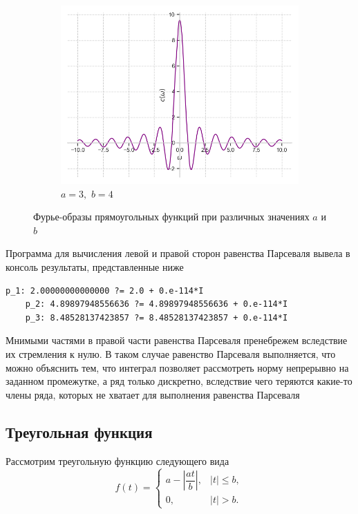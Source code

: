 \documentclass[a4paper, 16pt]{article}
\begin{document}
\begin{figure}[htbp]
\begin{subfigure}{0.3\textwidth}
        \end{subfigure}
        \hfill
        \begin{subfigure}{0.3\textwidth}
            \centering
            \includegraphics[width=\linewidth]{rectfimg_a=3_b=4.png}
            \caption{$a=3,\,\,b=4$}
            \label{fig:rectfimg_3}
        \end{subfigure}
        \caption{Фурье-образы прямоугольных функций при различных значениях $a$ и $b$}
        \label{fig:rectfimgs}
    \end{figure}


    \noindent Программа для вычисления левой и правой сторон равенства Парсеваля вывела в консоль результаты, представленные ниже
    \begin{lstlisting}[label=pres_rectf, caption=Результат выполнения программы для вычисления равенства Парсеваля]
    p_1: 2.00000000000000 ?= 2.0 + 0.e-114*I  
    p_2: 4.89897948556636 ?= 4.89897948556636 + 0.e-114*I 
    p_3: 8.48528137423857 ?= 8.48528137423857 + 0.e-114*I
    \end{lstlisting}


    \noindent Мнимыми частями в правой части равенства Парсеваля пренебрежем вследствие их стремления к нулю. В таком случае равенство Парсеваля выполняется, что можно объяснить тем, что интеграл позволяет
    рассмотреть норму непрерывно на заданном промежутке, а ряд только дискретно, вследствие чего теряются какие-то члены ряда,
    которых не хватает для выполнения равенства Парсеваля


    \subsection{Треугольная функция}
    \noindent Рассмотрим треугольную функцию следующего вида
    $$
    f(t)=
    \begin{cases}
        a-\left|\dfrac{at}{b}\right|, & \left|t\right|\leq b,\\
        0, & \left|t\right|>b.
    \end{cases}
    $$
\end{document}
